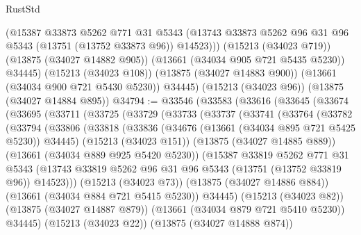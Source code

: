 \begin{lexlean}{RustStd}
\begin{coremodule}
          (@15387
            @33873
            @5262
            @771
            @31
            @5343
            (@13743 @33873 @5262 @96 @31 @96 @5343 (@13751 (@13752 @33873 @96)) @14523)))
        (@15213 (@34023 @719))
        (@13875 (@34027 @14882 @905))
        (@13661 (@34034 @905 @721 @5435 @5230))
        @34445)
      (@15213 (@34023 @108))
      (@13875 (@34027 @14883 @900))
      (@13661 (@34034 @900 @721 @5430 @5230))
      @34445)
    (@15213 (@34023 @96))
    (@13875 (@34027 @14884 @895))
@34794 := @33546
    (@33583
      (@33616
        (@33645
          (@33674
            (@33695
              (@33711
                (@33725
                  (@33729
                    (@33733
                      (@33737
                        (@33741
                          (@33764
                            (@33782
                              (@33794
                                (@33806
                                  (@33818
                                    (@33836
                                      (@34676 (@13661 (@34034 @895 @721 @5425 @5230)) @34445)
                                      (@15213 (@34023 @151))
                                      (@13875 (@34027 @14885 @889))
                                      (@13661 (@34034 @889 @925 @5420 @5230))
                                      (@15387
                                        @33819
                                        @5262
                                        @771
                                        @31
                                        @5343
                                        (@13743
                                          @33819
                                          @5262
                                          @96
                                          @31
                                          @96
                                          @5343
                                          (@13751 (@13752 @33819 @96))
                                          @14523)))
                                    (@15213 (@34023 @73))
                                    (@13875 (@34027 @14886 @884))
                                    (@13661 (@34034 @884 @721 @5415 @5230))
                                    @34445)
                                  (@15213 (@34023 @82))
                                  (@13875 (@34027 @14887 @879))
                                  (@13661 (@34034 @879 @721 @5410 @5230))
                                  @34445)
                                (@15213 (@34023 @22))
                                (@13875 (@34027 @14888 @874))

\end{coremodule}
\end{lexlean}
